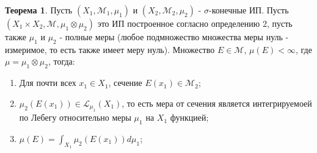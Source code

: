 \documentclass[12pt]{article}
\newcommand{\ML}{\mathcal{L}}
\newcommand{\MM}{\mathcal{M}}
\theoremstyle{definition}
\newtheorem{theorem}{Теорема}
\begin{document}
\begin{theorem}
	Пусть $(X_1, \MM_1, \mu_1)$ и $(X_2, \MM_2, \mu_2)$ - $\sigma$-конечные ИП. Пусть $(X_1 \times X_2, \MM, \mu_1 \otimes \mu_2)$ это ИП построенное согласно определению $2$, пусть также $\mu_1$ и $\mu_2$ - полные меры (любое подмножество множества меры нуль - измеримое, то есть также имеет меру нуль). Множество $E \in \MM$, $\mu(E) < \infty$, где $\mu = \mu_1 \otimes \mu_2$, тогда:
	\begin{enumerate}[label=\arabic*)]
		\item Для почти всех $x_1 \in X_1$, сечение $E(x_1) \in \MM_2$;
		\item $\mu_2(E(x_1)) \in \ML_{\mu_1}(X_1)$, то есть мера от сечения является интегрируемоей по Лебегу относительно меры $\mu_1$ на $X_1$ функцией;
		\item $\mu(E) = \int_{X_1}\mu_2(E(x_1))d\mu_1$;
	\end{enumerate}
\end{theorem}
\end{document}
